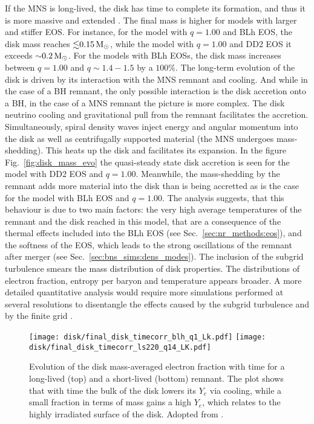 If the \ac{MNS} is long-lived, the disk has time to complete its formation,
and thus it is more massive and extended \citep{Perego:2019adq}. 
The final mass is higher for models with larger \mr{} and stiffer \ac{EOS}.
For instance, for the model with $q=1.00$ and BLh \ac{EOS}, 
the disk mass reaches ${\lesssim}0.15\,{\text{M}_{\odot}}$, while the model with $q=1.00$ 
and DD2 \ac{EOS} it exceeds ${\sim}0.2\,{\text{M}_{\odot}}$. For the models with BLh \acp{EOS}, 
the disk mass increases between $q=1.00$ and $q\sim1.4-1.5$ by a $100\%$.
%
The long-term evolution of the disk is driven by its interaction with the \ac{MNS} 
remnant and cooling. And while in the case of a \ac{BH} remnant, the only possible 
interaction is the disk accretion onto a \ac{BH}, in the case of a \ac{MNS} remnant 
the picture is more complex.
%
The disk neutrino cooling and gravitational pull from the remnant facilitates the 
accretion. Simultaneously, spiral density waves inject %
energy and angular momentum into the disk as well as centrifugally supported 
material (the \ac{MNS} undergoes mass-shedding). This heats up the disk and 
facilitates its expansion. 
%
In the figure Fig.~\ref{fig:disk_mass_evo} the quasi-steady state disk accretion
is seen for the model with DD2 \ac{EOS} and $q=1.00$. Meanwhile, the mass-shedding 
by the remnant adds more material into the disk than is being accretted as is the 
case for the model with BLh \ac{EOS} and $q=1.00$. 
%
The analysis suggests, that this behaviour is due to two main factors: the 
very high average temperatures of the remnant and the disk reached in this model, that  
are a consequence of the thermal effects included into the BLh \ac{EOS} 
(see Sec.~\ref{sec:nr_methods:eos}), and the softness of the \ac{EOS}, which leads 
to the strong oscillations of the remnant after merger (see Sec.~\ref{sec:bns_sims:dens_modes}).
%
The inclusion of the subgrid turbulence smears the mass distribution of disk 
properties. The distributions of electron fraction, entropy per baryon and 
temperature appears broader. A more detailed quantitative analysis would require more 
simulations performed at several resolutions to disentangle the effects 
caused by the subgrid turbulence and by the finite grid \citep{Bernuzzi:2020txg,Radice:2020ids}.

\begin{figure}[t]
    \centering 
    \texttt{[image: disk/final\_disk\_timecorr\_blh\_q1\_Lk.pdf]}
    \texttt{[image: disk/final\_disk\_timecorr\_ls220\_q14\_LK.pdf]}
    \caption{Evolution of the disk mass-averaged electron fraction with
        time for a long-lived (top) and a short-lived (bottom)
        remnant. The plot shows that with time the bulk of the disk lowers
        its $Y_e$ via cooling, while a small fraction in terms of mass
        gains a high $Y_e$, which relates to the highly 
        irradiated surface of the disk. Adopted from \citet{Nedora:2020pak}.
    }
    \label{fig:total_disk_time_corr_Ye_Blh_q1}
\end{figure}


